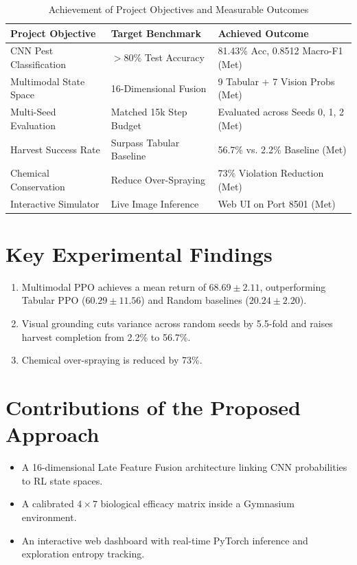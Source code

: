 \documentclass[12pt,a4paper]{report}
\begin{document}
\begin{table}[H]
\centering
\caption{Achievement of Project Objectives and Measurable Outcomes}
\label{tab:obj_achieved}
\begin{tabular}{p{3.5cm}p{4.0cm}p{6.5cm}}
\toprule
\textbf{Project Objective} & \textbf{Target Benchmark} & \textbf{Achieved Outcome} \\
\midrule
CNN Pest Classification & $> 80\%$ Test Accuracy & 81.43\% Acc, 0.8512 Macro-F1 (Met) \\
Multimodal State Space & 16-Dimensional Fusion & 9 Tabular + 7 Vision Probs (Met) \\
Multi-Seed Evaluation & Matched 15k Step Budget & Evaluated across Seeds 0, 1, 2 (Met) \\
Harvest Success Rate & Surpass Tabular Baseline & 56.7\% vs. 2.2\% Baseline (Met) \\
Chemical Conservation & Reduce Over-Spraying & 73\% Violation Reduction (Met) \\
Interactive Simulator & Live Image Inference & Web UI on Port 8501 (Met) \\
\bottomrule
\end{tabular}
\end{table}

\section{Key Experimental Findings}
\begin{enumerate}
    \item Multimodal PPO achieves a mean return of $68.69 \pm 2.11$, outperforming Tabular PPO ($60.29 \pm 11.56$) and Random baselines ($20.24 \pm 2.20$).
    \item Visual grounding cuts variance across random seeds by 5.5-fold and raises harvest completion from 2.2\% to 56.7\%.
    \item Chemical over-spraying is reduced by 73\%.
\end{enumerate}

\section{Contributions of the Proposed Approach}
\begin{itemize}
    \item A 16-dimensional Late Feature Fusion architecture linking CNN probabilities to RL state spaces.
    \item A calibrated $4 \times 7$ biological efficacy matrix inside a Gymnasium environment.
    \item An interactive web dashboard with real-time PyTorch inference and exploration entropy tracking.
\end{itemize}
\end{document}

